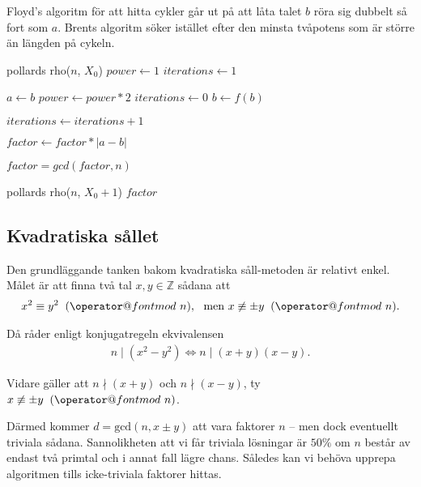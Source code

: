 \documentclass[a4paper,12pt]{article}
\makeatletter
\def\imod#1{\allowbreak\mkern10mu({\operator@font mod}\,\,#1)}
\renewcommand{\*}{\ensuremath{\cdot}}
\makeatother
\begin{document}
Floyd's algoritm för att hitta cykler går ut på att låta talet $b$ röra sig dubbelt så fort som $a$. Brents algoritm söker istället efter den minsta tvåpotens som är större än längden på cykeln.
\begin{algorithmic}
    \STATE pollards rho($n$, $X_0$)
        \STATE $power \gets 1$
        \STATE $iterations \gets 1$

                    \STATE $a \gets b$
                    \STATE $power \gets power *2$
                    \STATE $iterations \gets 0$
                \ENDIF 
                \STATE $b \gets f(b)$

                \STATE $iterations \gets iterations + 1$

                \STATE $factor \gets factor * |a-b|$
            
            \ENDFOR


            \STATE $factor = gcd(factor, n)$
        \ENDWHILE

            \STATE {}
            \RETURN pollards rho($n$, $X_0+1$) 
            \RETURN $factor$
        \ENDIF
\end{algorithmic}


\subsection{Kvadratiska sållet}

Den grundläggande tanken bakom kvadratiska såll-metoden är relativt enkel. Målet
är att finna två tal $x, y \in \mathbb{Z}$ sådana att
\begin{align*}
    x^2 \equiv y^2 \imod{n}, \ \text{ men } x \not\equiv \pm y \imod{n}.
\end{align*}

Då råder enligt konjugatregeln ekvivalensen
\begin{align*}
    n \mid (x^2 - y^2) \Leftrightarrow n \mid (x+y)(x-y).
\end{align*}

Vidare gäller att $n \nmid (x+y)$ och $n \nmid (x-y)$, ty $x \not\equiv \pm y
\imod{n}$. 

Därmed kommer $d = \text{gcd}\left( n, x \pm y \right)$ att vara faktorer  $n$
-- men dock eventuellt triviala sådana. Sannolikheten att vi får triviala
lösningar är $50 \%$ om $n$ består av endast två primtal och i annat fall lägre
chans. Således kan vi behöva upprepa algoritmen tills icke-triviala faktorer
hittas.
\end{document}

